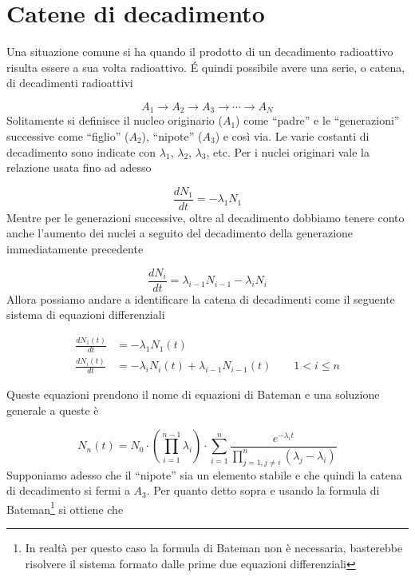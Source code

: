 \newpage

\section{Catene di decadimento}

Una situazione comune si ha quando il prodotto di un decadimento radioattivo risulta essere a sua volta radioattivo. 
\'E quindi possibile avere una serie, o catena, di decadimenti radioattivi 

\[
A_1 \longrightarrow A_2 \longrightarrow A_3 \longrightarrow \cdots \longrightarrow A_N
\]
Solitamente si definisce il nucleo originario ($A_1$) come ``padre'' e le ``generazioni'' successive come ``figlio'' ($A_2$), ``nipote'' ($A_3$) e così via. 
Le varie costanti di decadimento sono indicate con $\lambda_1$, $\lambda_2$, $\lambda_3$, etc. Per i nuclei originari vale la relazione usata fino ad adesso 

\begin{equation}
    \frac{dN_1}{dt} = - \lambda_1 N_1
\end{equation}
Mentre per le generazioni successive, oltre al decadimento dobbiamo tenere conto anche l'aumento dei nuclei a seguito del decadimento della generazione immediatamente precedente

\begin{equation}
    \frac{dN_i}{dt} = \lambda_{i-1} N_{i-1} - \lambda_{i} N_i
\end{equation}
Allora possiamo andare a identificare la catena di decadimenti come il seguente sistema di equazioni differenziali 

\begin{tcolorbox}[colback=black!5!white, colframe=black!45!white, boxrule=0.8pt]
\begin{equation}
\begin{aligned}
\frac{d N_1(t)}{d t} & =-\lambda_1 N_1(t) \\
\frac{d N_i(t)}{d t} & =-\lambda_i N_i(t)+\lambda_{i-1} N_{i-1}(t) \qquad 1 < i \leq n
\end{aligned}
\end{equation}
\end{tcolorbox}
Queste equazioni prendono il nome di equazioni di Bateman e una soluzione generale a queste è 

\begin{equation}
    N_n(t)= N_0 \cdot \left(\prod_{i=1}^{n-1} \lambda_i\right) \cdot \sum_{i=1}^n \frac{e^{-\lambda_i t}}{\prod_{j=1, j \neq i}^n\left(\lambda_j-\lambda_i\right)}
\end{equation}
Supponiamo adesso che il ``nipote'' sia un elemento stabile e che quindi la catena di decadimento si fermi a $A_3$. Per quanto detto sopra e usando la formula di Bateman\footnote{In realtà per questo caso la formula di Bateman non è necessaria, basterebbe risolvere il sistema formato dalle prime due equazioni differenziali} si ottiene che 

